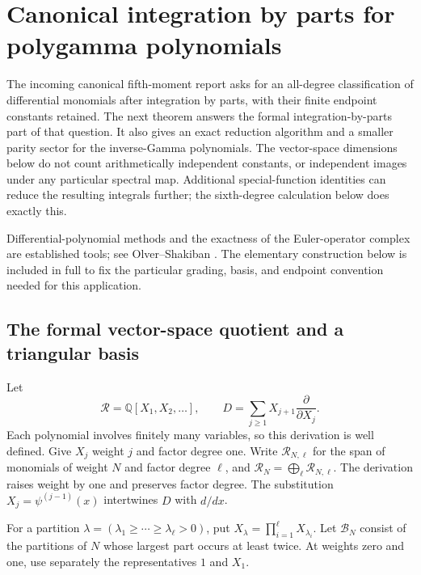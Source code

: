 \documentclass[11pt,a4paper]{article}
\numberwithin{equation}{section}
\theoremstyle{plain}
\theoremstyle{definition}
\theoremstyle{remark}
\begin{document}
\section{Canonical integration by parts for polygamma polynomials}
\label{dq:section}

The incoming canonical fifth-moment report asks for an all-degree
classification of differential monomials after integration by parts,
with their finite endpoint constants retained. The next theorem answers
the formal integration-by-parts part of that question. It also gives an
exact reduction algorithm and a smaller parity sector for the inverse-Gamma
polynomials. The vector-space dimensions below do not count arithmetically
independent constants, or independent images under any particular spectral
map. Additional special-function identities can reduce the resulting
integrals further; the sixth-degree calculation below does exactly this.

Differential-polynomial methods and the exactness of the Euler-operator
complex are established tools; see Olver--Shakiban
\cite{OlverShakiban1978}. The elementary construction below is included
in full to fix the particular grading, basis, and endpoint convention
needed for this application.

\subsection{The formal vector-space quotient and a triangular basis}

Let
\[
 \mathscr R=\mathbb Q[X_1,X_2,\ldots],\qquad
 D=\sum_{j\ge1}X_{j+1}\frac{\partial}{\partial X_j}.
\]
Each polynomial involves finitely many variables, so this derivation
is well defined. Give $X_j$ weight $j$ and factor degree one. Write
$\mathscr R_{N,\ell}$ for the span of monomials of weight $N$ and
factor degree $\ell$, and $\mathscr R_N=\bigoplus_\ell\mathscr R_{N,\ell}$.
The derivation raises weight by one and preserves factor degree.
The substitution $X_j=\psi^{(j-1)}(x)$ intertwines $D$ with $d/dx$.

For a partition $\lambda=(\lambda_1\ge\cdots\ge\lambda_\ell>0)$,
put $X_\lambda=\prod_{i=1}^\ell X_{\lambda_i}$.
Let $\mathscr B_N$ consist of the partitions of $N$ whose largest
part occurs at least twice. At weights zero and one, use separately
the representatives $1$ and $X_1$.
\end{document}
